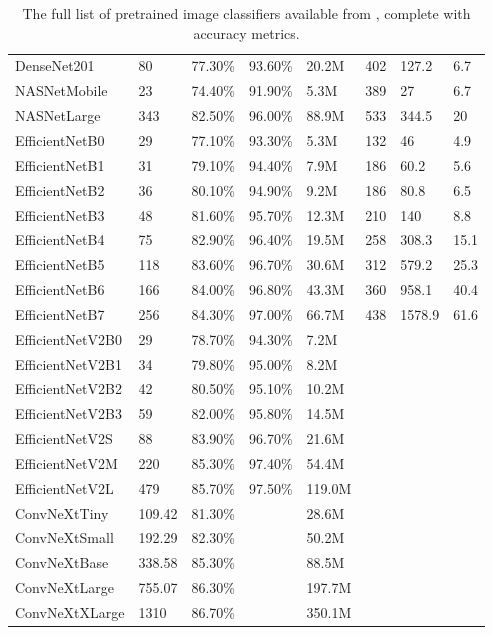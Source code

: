 \begin{appendices}
\begin{table}[ht]
{\begin{tabular}{llllllll}
            DenseNet201 & 80 & 77.30\% & 93.60\% & 20.2M & 402 & 127.2 & 6.7 \\ 
            NASNetMobile & 23 & 74.40\% & 91.90\% & 5.3M & 389 & 27 & 6.7 \\ 
            NASNetLarge & 343 & 82.50\% & 96.00\% & 88.9M & 533 & 344.5 & 20 \\ 
            EfficientNetB0 & 29 & 77.10\% & 93.30\% & 5.3M & 132 & 46 & 4.9 \\ 
            EfficientNetB1 & 31 & 79.10\% & 94.40\% & 7.9M & 186 & 60.2 & 5.6 \\ 
            EfficientNetB2 & 36 & 80.10\% & 94.90\% & 9.2M & 186 & 80.8 & 6.5 \\ 
            EfficientNetB3 & 48 & 81.60\% & 95.70\% & 12.3M & 210 & 140 & 8.8 \\ 
            EfficientNetB4 & 75 & 82.90\% & 96.40\% & 19.5M & 258 & 308.3 & 15.1 \\ 
            EfficientNetB5 & 118 & 83.60\% & 96.70\% & 30.6M & 312 & 579.2 & 25.3 \\ 
            EfficientNetB6 & 166 & 84.00\% & 96.80\% & 43.3M & 360 & 958.1 & 40.4 \\ 
            EfficientNetB7 & 256 & 84.30\% & 97.00\% & 66.7M & 438 & 1578.9 & 61.6 \\ 
            EfficientNetV2B0 & 29 & 78.70\% & 94.30\% & 7.2M & ~ & ~ & ~ \\ 
            EfficientNetV2B1 & 34 & 79.80\% & 95.00\% & 8.2M & ~ & ~ & ~ \\ 
            EfficientNetV2B2 & 42 & 80.50\% & 95.10\% & 10.2M & ~ & ~ & ~ \\ 
            EfficientNetV2B3 & 59 & 82.00\% & 95.80\% & 14.5M & ~ & ~ & ~ \\ 
            EfficientNetV2S & 88 & 83.90\% & 96.70\% & 21.6M & ~ & ~ & ~ \\ 
            EfficientNetV2M & 220 & 85.30\% & 97.40\% & 54.4M & ~ & ~ & ~ \\ 
            EfficientNetV2L & 479 & 85.70\% & 97.50\% & 119.0M & ~ & ~ & ~ \\ 
            ConvNeXtTiny & 109.42 & 81.30\% & ~ & 28.6M & ~ & ~ & ~ \\ 
            ConvNeXtSmall & 192.29 & 82.30\% & ~ & 50.2M & ~ & ~ & ~ \\ 
            ConvNeXtBase & 338.58 & 85.30\% & ~ & 88.5M & ~ & ~ & ~ \\ 
            ConvNeXtLarge & 755.07 & 86.30\% & ~ & 197.7M & ~ & ~ & ~ \\ 
            ConvNeXtXLarge & 1310 & 86.70\% & ~ & 350.1M & ~ & ~ & ~ \\
            \bottomrule
        \end{tabular}
    }
    \caption{The full list of pretrained image classifiers available from , complete with accuracy metrics.}
\end{table}


\end{appendices}
